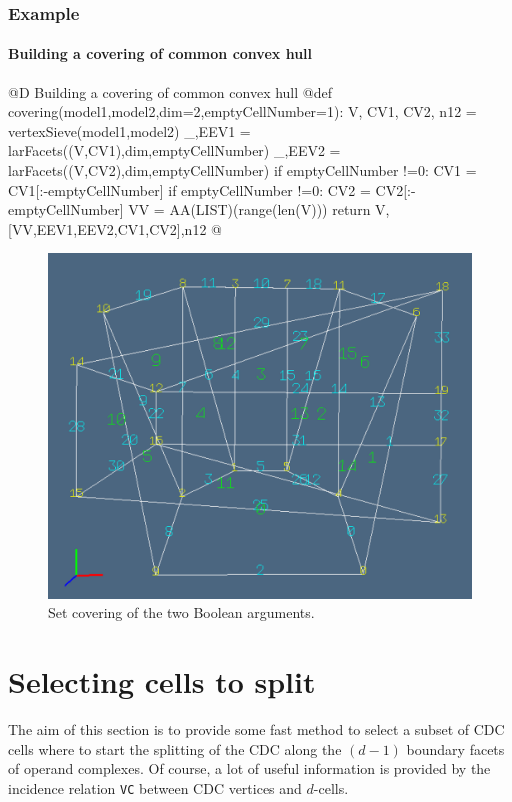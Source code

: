 \documentclass[11pt,oneside]{article}	%
\begin{document}
\subsubsection{Example}

\paragraph{Building a covering of common convex hull}

@D Building a covering of common convex hull
@{def covering(model1,model2,dim=2,emptyCellNumber=1):
	V, CV1, CV2, n12 = vertexSieve(model1,model2)
	_,EEV1 = larFacets((V,CV1),dim,emptyCellNumber)
	_,EEV2 = larFacets((V,CV2),dim,emptyCellNumber)
	if emptyCellNumber !=0: CV1 = CV1[:-emptyCellNumber]
	if emptyCellNumber !=0: CV2 = CV2[:-emptyCellNumber]
	VV = AA(LIST)(range(len(V)))
	return V,[VV,EEV1,EEV2,CV1,CV2],n12
@}

\begin{figure}[htbp] %
   \centering
   \includegraphics[width=0.6\linewidth]{images/covering} 
   \caption{Set covering of the two Boolean arguments.}
   \label{fig:example}
\end{figure}




\section{Selecting cells to split}

The aim of this section is to provide some fast method to select a subset of CDC cells where to start the 
splitting of the CDC along the $(d-1)$ boundary facets of operand complexes. Of course,  a lot of useful information is provided  by the incidence relation \texttt{VC} between CDC vertices and $d$-cells. 
\end{document}

